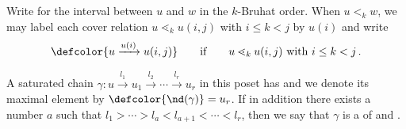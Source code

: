 Write  for the interval between $u$ and $w$ in the
$k$-Bruhat order.
When $u<_k w$, we may label each cover relation $u\lessdot_k u(i,j)$ with $i\leq k<j$ by $u(i)$ and write
\begin{equation*}
    \defcolor{u \xrightarrow{u(i)} u(i,j)}
    \qquad \text{if} \qquad
    u \lessdot_k u(i,j)\ \mbox{with}\ i\leq k<j\,.
\end{equation*}

A saturated chain 
$\gamma\colon u\xrightarrow{l_1}u_1\xrightarrow{l_2}\dotsb\xrightarrow{l_r}u_r$
in this poset has 
and we denote its maximal element by $\defcolor{\nd(\gamma)} = u_r$.
If in addition there exists a number $a$ such that $l_1>\dotsb >l_a<l_{a+1}<\dotsb<l_{r}$, then we say that $\gamma$ is
a  of  and .


